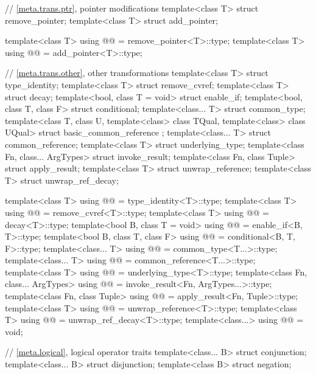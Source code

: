 \begin{codeblock}
{  // \ref{meta.trans.ptr}, pointer modifications
  template<class T> struct remove_pointer;
  template<class T> struct add_pointer;

  template<class T>
    using @@ = remove_pointer<T>::type;
  template<class T>
    using @@    = add_pointer<T>::type;

  // \ref{meta.trans.other}, other transformations
  template<class T> struct type_identity;
  template<class T> struct remove_cvref;
  template<class T> struct decay;
  template<bool, class T = void> struct enable_if;
  template<bool, class T, class F> struct conditional;
  template<class... T> struct common_type;
  template<class T, class U, template<class> class TQual, template<class> class UQual>
    struct basic_common_reference { };
  template<class... T> struct common_reference;
  template<class T> struct underlying_type;
  template<class Fn, class... ArgTypes> struct invoke_result;
  template<class Fn, class Tuple> struct apply_result;
  template<class T> struct unwrap_reference;
  template<class T> struct unwrap_ref_decay;

  template<class T>
    using @@    = type_identity<T>::type;
  template<class T>
    using @@     = remove_cvref<T>::type;
  template<class T>
    using @@            = decay<T>::type;
  template<bool B, class T = void>
    using @@        = enable_if<B, T>::type;
  template<bool B, class T, class F>
    using @@      = conditional<B, T, F>::type;
  template<class... T>
    using @@      = common_type<T...>::type;
  template<class... T>
    using @@ = common_reference<T...>::type;
  template<class T>
    using @@  = underlying_type<T>::type;
  template<class Fn, class... ArgTypes>
    using @@    = invoke_result<Fn, ArgTypes...>::type;
  template<class Fn, class Tuple>
    using @@     = apply_result<Fn, Tuple>::type;
  template<class T>
    using @@ = unwrap_reference<T>::type;
  template<class T>
    using @@ = unwrap_ref_decay<T>::type;
  template<class...>
    using @@             = void;

  // \ref{meta.logical}, logical operator traits
  template<class... B> struct conjunction;
  template<class... B> struct disjunction;
  template<class B> struct negation;

}
\end{codeblock}
